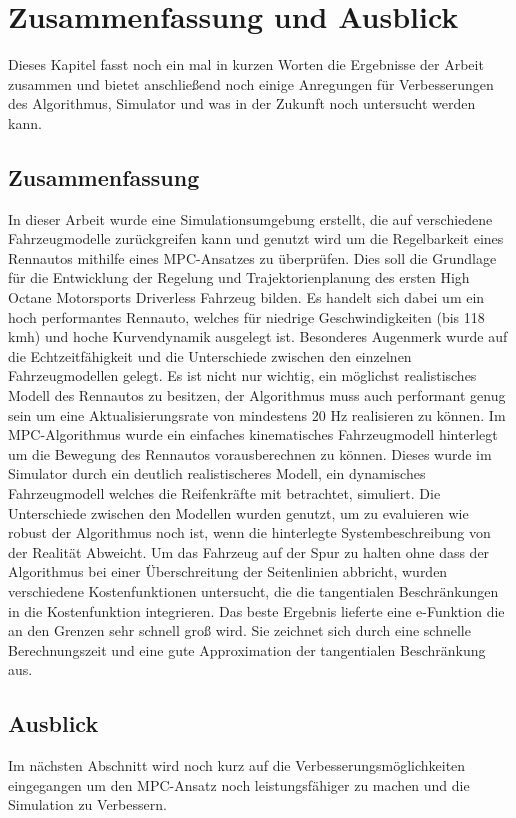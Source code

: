 \documentclass{like}
\begin{document}
\chapter[Ausblick]{Zusammenfassung und Ausblick}
Dieses Kapitel fasst noch ein mal in kurzen Worten die Ergebnisse der Arbeit zusammen und bietet anschließend noch einige Anregungen für Verbesserungen des Algorithmus, Simulator und was in der Zukunft noch untersucht werden kann.
\section{Zusammenfassung}
In dieser Arbeit wurde eine Simulationsumgebung erstellt, die auf verschiedene Fahrzeugmodelle zurückgreifen kann und genutzt wird um die Regelbarkeit eines Rennautos mithilfe eines \ac{MPC}-Ansatzes zu überprüfen. Dies soll die Grundlage für die Entwicklung der Regelung und Trajektorienplanung des ersten High Octane Motorsports Driverless Fahrzeug bilden. Es handelt sich dabei um ein hoch performantes Rennauto, welches für niedrige Geschwindigkeiten (bis 118 kmh) und hoche Kurvendynamik ausgelegt ist. Besonderes Augenmerk wurde auf die Echtzeitfähigkeit und die Unterschiede zwischen den einzelnen Fahrzeugmodellen gelegt. Es ist nicht nur wichtig, ein möglichst realistisches Modell des Rennautos zu besitzen, der Algorithmus muss auch performant genug sein um eine Aktualisierungsrate von mindestens 20 Hz realisieren zu können. 
Im \ac{MPC}-Algorithmus wurde ein einfaches kinematisches Fahrzeugmodell hinterlegt um die Bewegung des Rennautos vorausberechnen zu können. Dieses wurde im Simulator durch ein deutlich realistischeres Modell, ein dynamisches Fahrzeugmodell welches die Reifenkräfte mit betrachtet, simuliert. Die Unterschiede zwischen den Modellen wurden genutzt, um zu evaluieren wie robust der Algorithmus noch ist, wenn die hinterlegte Systembeschreibung von der Realität Abweicht. Um das Fahrzeug auf der Spur zu halten ohne dass der Algorithmus bei einer Überschreitung der Seitenlinien abbricht, wurden verschiedene Kostenfunktionen untersucht, die die tangentialen Beschränkungen in die Kostenfunktion integrieren. Das beste Ergebnis lieferte eine e-Funktion die an den Grenzen sehr schnell groß wird. Sie zeichnet sich durch eine schnelle Berechnungszeit und eine gute Approximation der tangentialen Beschränkung aus.

\section{Ausblick}
Im nächsten Abschnitt wird noch kurz auf die Verbesserungsmöglichkeiten eingegangen um den \ac{MPC}-Ansatz noch leistungsfähiger zu machen und die Simulation zu Verbessern.
\end{document}
